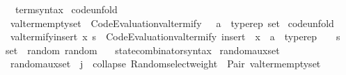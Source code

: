 \begin{isabellebody}
{\isafoldproof}%
%
\isadelimproof
\isanewline
%
\endisadelimproof
\isanewline
{}\isamarkupfalse%
\isanewline
\ \ \ term{\isacharunderscore}{\kern0pt}syntax\isanewline
{}\isanewline
\isanewline
{}\isamarkupfalse%
\ {\isacharbrackleft}{\kern0pt}code{\isacharunderscore}{\kern0pt}unfold{\isacharbrackright}{\kern0pt}{\isacharcolon}{\kern0pt}\isanewline
\ \ {\isachardoublequoteopen}valterm{\isacharunderscore}{\kern0pt}emptyset\ {\isacharequal}{\kern0pt}\ Code{\isacharunderscore}{\kern0pt}Evaluation{\isachardot}{\kern0pt}valtermify\ {\isacharparenleft}{\kern0pt}{\isacharbraceleft}{\kern0pt}{\isacharbraceright}{\kern0pt}\ {\isacharcolon}{\kern0pt}{\isacharcolon}{\kern0pt}\ {\isacharparenleft}{\kern0pt}{\isacharprime}{\kern0pt}a\ {\isacharcolon}{\kern0pt}{\isacharcolon}{\kern0pt}\ typerep{\isacharparenright}{\kern0pt}\ set{\isacharparenright}{\kern0pt}{\isachardoublequoteclose}\isanewline
\isanewline
{}\isamarkupfalse%
\ {\isacharbrackleft}{\kern0pt}code{\isacharunderscore}{\kern0pt}unfold{\isacharbrackright}{\kern0pt}{\isacharcolon}{\kern0pt}\isanewline
\ \ {\isachardoublequoteopen}valtermify{\isacharunderscore}{\kern0pt}insert\ x\ s\ {\isacharequal}{\kern0pt}\ Code{\isacharunderscore}{\kern0pt}Evaluation{\isachardot}{\kern0pt}valtermify\ insert\ {\isacharbraceleft}{\kern0pt}{\isasymcdot}{\isacharbraceright}{\kern0pt}\ {\isacharparenleft}{\kern0pt}x\ {\isacharcolon}{\kern0pt}{\isacharcolon}{\kern0pt}\ {\isacharparenleft}{\kern0pt}{\isacharprime}{\kern0pt}a\ {\isacharcolon}{\kern0pt}{\isacharcolon}{\kern0pt}\ typerep\ {\isacharasterisk}{\kern0pt}\ {\isacharunderscore}{\kern0pt}{\isacharparenright}{\kern0pt}{\isacharparenright}{\kern0pt}\ {\isacharbraceleft}{\kern0pt}{\isasymcdot}{\isacharbraceright}{\kern0pt}\ s{\isachardoublequoteclose}\isanewline
\isanewline
{}\isamarkupfalse%
\isanewline
\isanewline
{}\isamarkupfalse%
\ set\ {\isacharcolon}{\kern0pt}{\isacharcolon}{\kern0pt}\ {\isacharparenleft}{\kern0pt}random{\isacharparenright}{\kern0pt}\ random\isanewline
{}\isanewline
\isanewline
{}\isamarkupfalse%
\isanewline
\ \ \ state{\isacharunderscore}{\kern0pt}combinator{\isacharunderscore}{\kern0pt}syntax\isanewline
{}\isanewline
\isanewline
{}\isamarkupfalse%
\ random{\isacharunderscore}{\kern0pt}aux{\isacharunderscore}{\kern0pt}set\isanewline
{}\isanewline
\ \ {\isachardoublequoteopen}random{\isacharunderscore}{\kern0pt}aux{\isacharunderscore}{\kern0pt}set\ {}\ j\ {\isacharequal}{\kern0pt}\ collapse\ {\isacharparenleft}{\kern0pt}Random{\isachardot}{\kern0pt}select{\isacharunderscore}{\kern0pt}weight\ {\isacharbrackleft}{\kern0pt}{\isacharparenleft}{\kern0pt}{}{\isacharcomma}{\kern0pt}\ Pair\ valterm{\isacharunderscore}{\kern0pt}emptyset{\isacharparenright}{\kern0pt}{\isacharbrackright}{\kern0pt}{\isacharparenright}{\kern0pt}{\isachardoublequoteclose}\isanewline

\end{isabellebody}
